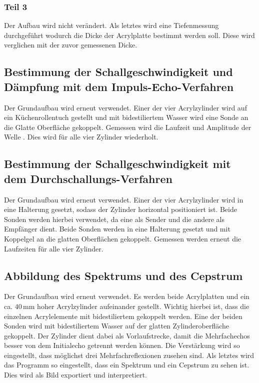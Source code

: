 \subsubsection{Teil 3}

\begin{flushleft}
    Der Aufbau wird nicht verändert.
    Als letztes wird eine Tiefenmessung durchgeführt wodurch die Dicke der Acrylplatte bestimmt werden soll.
    Diese wird verglichen mit der zuvor gemessenen Dicke. 
\end{flushleft}

\subsection{Bestimmung der Schallgeschwindigkeit und Dämpfung mit dem Impuls-Echo-Verfahren}

\begin{flushleft} 
    Der Grundaufbau wird erneut verwendet.
    Einer der vier Acrylzylinder wird auf ein Küchenrollentuch gestellt und mit bidestiliertem Wasser wird eine Sonde an die Glatte Oberfläche gekoppelt.
    Gemessen wird die Laufzeit und Amplitude der Welle .
    Dies wird für alle vier Zylinder wiederholt.
\end{flushleft}

\subsection{Bestimmung der Schallgeschwindigkeit mit dem Durchschallungs-Verfahren}

\begin{flushleft}
    Der Grundaufbau wird erneut verwendet.
    Einer der vier Acrylzylinder wird in eine Halterung gesetzt, sodass der Zylinder horizontal positioniert ist.
    Beide Sonden werden hierbei verwendet, da eine als Sender und die andere als Empfänger dient.
    Beide Sonden werden in eine Halterung gesetzt und mit Koppelgel an die glatten Oberflächen gekoppelt.
    Gemessen werden erneut die Laufzeiten für alle vier Zylinder. 
\end{flushleft}

\subsection{Abbildung des Spektrums und des Cepstrum}

\begin{flushleft}
    Der Grundaufbau wird erneut verwendet.
    Es werden beide Acrylplatten und ein ca. $40\,\unit{\milli\meter}$ hoher Acrylzylinder aufeinander gestellt.
    Wichtig hierbei ist, dass die einzelnen Acrylelemente mit bidestiliertem gekoppelt werden. 
    Eine der beiden Sonden wird mit bidestiliertem Wasser auf der glatten Zylinderoberfläche gekoppelt. 
    Der Zylinder dient dabei als Vorlaufstrecke, damit die Mehrfachechos besser von dem Initialecho getrennt werden können.
    Die Verstärkung wird so eingestellt, dass möglichst drei Mehrfachreflexionen zusehen sind.
    Als letztes wird das Programm so eingestellt, dass ein Spektrum und ein Cepstrum zu sehen ist.
    Dies wird als Bild exportiert und interpretiert.
\end{flushleft}

